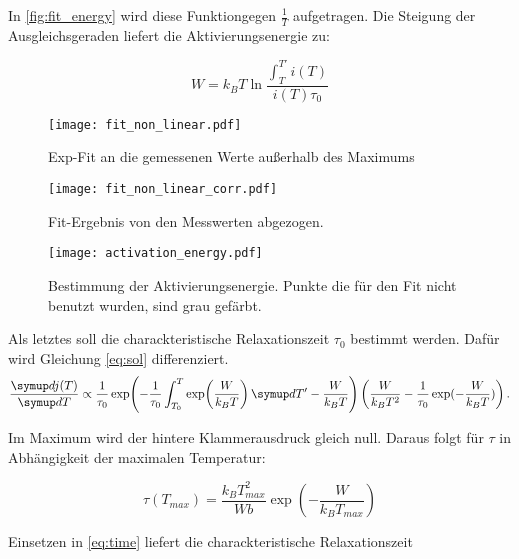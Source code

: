 In \autoref{fig:fit_energy} wird diese Funktiongegen $\frac{1}{T}$ aufgetragen. Die Steigung der Ausgleichsgeraden liefert die Aktivierungsenergie zu:
\begin{equation}
  
\end{equation}

\begin{equation}
  W = k_B T \ln \frac{\int_T^{T'} i(T)}{ i(T) \tau_0}
  \label{eq:final}
\end{equation}

\begin{figure}
  \centering
  \texttt{[image: fit\_non\_linear.pdf]}
  \caption{Exp-Fit an die gemessenen Werte außerhalb des Maximums}
  \label{fig:fit_non_linear}
\end{figure}

\begin{figure}
  \centering
  \texttt{[image: fit\_non\_linear\_corr.pdf]}
  \caption{Fit-Ergebnis von den Messwerten abgezogen.}
  \label{fig:fit_non_linear_corr}
\end{figure}


\begin{figure}
  \centering
  \texttt{[image: activation\_energy.pdf]}
  \caption{Bestimmung der Aktivierungsenergie. Punkte die für den Fit nicht benutzt wurden, sind grau gefärbt.}
  \label{fig:fit_energy}
\end{figure}


Als letztes soll die charackteristische Relaxationszeit $\tau_0$ bestimmt werden. Dafür wird Gleichung \eqref{eq:sol} differenziert.
\begin{equation}
  \label{eq:crazy}
  \dd{j(T)}{T} \propto
    \frac{1}{\tau_0}
    \exp\!\left(
      -\frac{1}{\tau_0} \int_{T_0}^{T} \exp\! \left( \frac{W}{k_B T} \right)  \dif{T'} - \frac{W}{k_B T}
    \right) \left( \frac{W}{k_B T^2} -   \frac{1}{\tau_0}\exp(-\frac{W}{k_B T}) \right).
\end{equation}

Im Maximum wird der hintere Klammerausdruck gleich null. Daraus folgt für $\tau$ in Abhängigkeit der maximalen Temperatur:

\begin{equation}
  \label{eq:tau}
  \tau(T_{max}) = \frac{k_B T_{max}^2}{W b} \exp\left(-\frac{W}{k_B T_{max}} \right)
\end{equation}

Einsetzen in \eqref{eq:time} liefert die  charackteristische Relaxationszeit
\begin{equation}
  
\end{equation}
